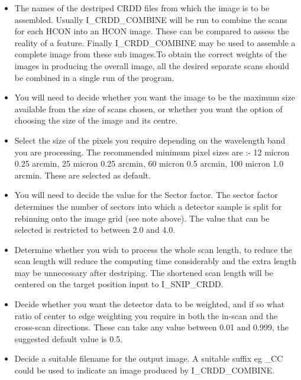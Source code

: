 \documentclass[nolof,noabs,11pt]{starlink}
\begin{document}
\begin{itemize}

\item The names of the destriped CRDD files from which the image is to be
assembled. Usually I\_CRDD\_COMBINE will be run to combine the scans for each
HCON into an HCON image. These can be compared to assess the reality of a
feature. Finally I\_CRDD\_COMBINE may be used to assemble a complete image from
these sub images.To obtain the correct weights of the images in producing the
overall image, all the desired separate scans should be combined in a single
run of the program.

\item You will need to decide whether you want the image to be the maximum size
available from the size of scans chosen, or whether you want the option of
choosing the size of the image and its centre.

\item Select the size of the pixels you require depending
on the wavelength band you are processing. The recommended minimum pixel sizes
are :- 12 micron  0.25 arcmin, 25 micron  0.25 arcmin, 60 micron   0.5 arcmin,
100 micron  1.0 arcmin. These are selected as default.

\item You will need to decide the value for the Sector factor. The sector factor
determines the number of sectors into which a detector sample is split for
rebinning onto the image grid (see note above). The value that can be selected
is restricted to between 2.0 and 4.0.

\item Determine whether you wish to process the whole scan length, to reduce
the scan length will reduce the computing time considerably and the extra
length may be unnecessary after destriping. The shortened scan length will be
centered on the target position input to I\_SNIP\_CRDD.

\item Decide whether you want the detector data to be weighted, and if so what
ratio of center to edge weighting you require in both the in-scan and the
cross-scan directions. These can take any value between 0.01 and 0.999, the
suggested default value is 0.5.

\item Decide a suitable filename for the output image. A suitable suffix eg \_CC
could be used to indicate an image produced by I\_CRDD\_COMBINE.

\end{itemize}
\end{document}
